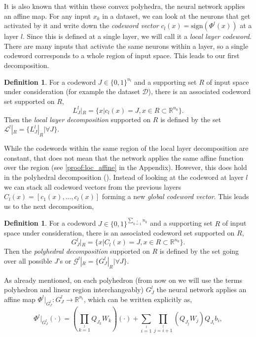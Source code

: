 \documentclass[10pt]{article} %
\theoremstyle{plain}
\theoremstyle{definition}
\newtheorem{definition}[theorem]{Definition}
\theoremstyle{remark}
\begin{document}
It is also known that within these convex polyhedra, the neural network applies an affine map. For any input $x_k$ in a dataset, we can look at the neurons that get activated by it and write down the \textit{codeword vector} $c_l(x) = \text{sign}(\Phi^l(x))$ at a layer $l$. Since this is defined at a single layer, we will call it a \textit{local layer codeword}. There are many inputs that activate the same neurons within a layer, so a single codeword corresponds to a whole region of input space. This leads to our first decomposition.

\begin{definition}
    For a codeword $J  \in \{0,1\}^{n_l}$ and a supporting set $R$ of input space under consideration (for example the dataset $\mathcal{D}$), there is an associated codeword set supported on $R$,
    \begin{equation}
        L^l_J|_R = \{x | c_l(x)=J, x \in R \subset \mathbb{R}^{n_0}\}.
    \end{equation}
    Then the \textit{local layer decomposition} supported on $R$ is defined by the set $\mathcal{L}^l|_R = \{L^l_J|_R| \forall J\}$.
\end{definition}

While the codewords within the same region of the local layer decomposition are constant, that does not mean that the network applies the same affine function over the region (see \ref{proof:loc_affine} in the Appendix). However, this  does hold in the polyhedral decomposition (\cite{liu2023relu}). Instead of looking at the codeword at layer $l$ we can stack all codeword vectors from the previous layers $C_l(x) = [c_1(x),...,c_l(x)]$ forming a new \textit{global codeword vector}. This leads us to the next decomposition,

\begin{definition}
    For a codeword $J \in \{0,1\}^{\sum\limits_{k=1}\limits^{l} n_k}$  and a supporting set $R$ of input space under consideration, there is an associated codeword set supported on $R$,
    \begin{equation}
        G^l_J|_R = \{x | C_l(x)=J, x \in R \subset \mathbb{R}^{n_0}\}.
    \end{equation}
    Then the \textit{polyhedral decomposition} supported on $R$ is defined by the set going over all possible $J$'s or $\mathcal{G}^l|_R = \{G^l_J|_R| \forall J\}$.
\end{definition}

As already mentioned, on each polyhedron {(from now on we will use the terms polyhedron and linear region interchangeably)} $G^l_J$ the neural network applies an affine map $\Phi^l|_{G^l_J}: G^l_J \to \mathbb{R}^{n_l}$, which can be written explicitly as,
\begin{equation}
    \label{eq: Phi rank}
    \Phi^l|_{G^l_J} (\cdot) = (\prod\limits_{k=1}\limits^{l} Q_{J_k}W_k) (\cdot)+\sum\limits_{i=1}\limits^{l} \prod\limits_{j=i+1}\limits^{l} (Q_{J_j}W_j) Q_{J_i}b_i,
\end{equation}
\end{document}
